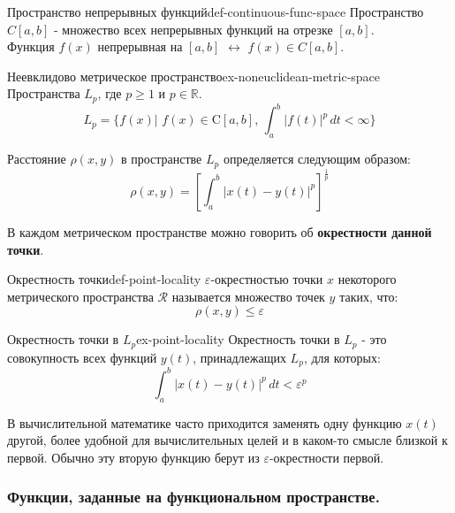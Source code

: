 \documentclass[14pt]{extarticle}
\begin{document}
        \begin{definition}{Пространство непрерывных функций}{def-continuous-func-space}
            Пространство $C[a, b]$ - множество всех непрерывных функций на отрезке $[a, b]$.\\
            Функция $f(x)$ непрерывная на $[a, b]$ $\leftrightarrow$ $f(x) \in C[a, b]$.
        \end{definition}

        \begin{example}{Неевклидово метрическое пространство}{ex-noneuclidean-metric-space}
            Пространства $L_{p}$, где $p \geq 1$ и $p \in \mathbb{R}$.
            $$L_{p} = \{f(x) \text{| } f(x) \in \text{C}[a, b] \text{, } \int_{a}^{b}|f(t)|^{p} \, dt < \infty\}$$

            \vspace{\baselineskip}

            Расстояние $\rho(x, y)$ в пространстве $L_{p}$ определяется следующим образом:
            $$\rho(x, y) = [\int_{a}^{b}|x(t) - y(t)|^{p}]^{\frac{1}{p}}$$
        \end{example}

        В каждом метрическом пространстве можно говорить об \textbf{окрестности данной точки}.

        \begin{definition}{Окрестность точки}{def-point-locality}
            $\varepsilon$-окрестностью точки $x$ некоторого метрического пространства $\mathscr{R}$ называется множество точек $y$ таких, что:
            $$\rho(x, y) \leq \varepsilon$$
        \end{definition}

        \begin{example}{Окрестность точки в $L_{p}$}{ex-point-locality}
            Окрестность точки в $L_{p}$ - это совокупность всех функций $y(t)$, принадлежащих $L_{p}$, для которых:
            $$\int_{a}^{b} |x(t) - y(t)|^{p} \, dt < \varepsilon^{p}$$
        \end{example}

        В вычислительной математике часто приходится заменять одну функцию $x(t)$ другой, более удобной для вычислительных целей и в каком-то смысле близкой к первой. Обычно эту вторую функцию берут из $\varepsilon$-окрестности первой.

    \subsubsection{Функции, заданные на функциональном пространстве.}
        
\end{document}
